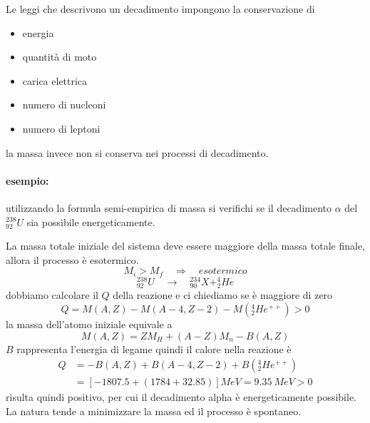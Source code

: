Le leggi che descrivono un decadimento impongono la conservazione di 
\begin{itemize}
\item energia
\item quantità di moto
\item carica elettrica
\item numero di nucleoni
\item numero di leptoni
\end{itemize}
la massa invece non si conserva nei processi di decadimento.

\paragraph{esempio:} utilizzando la formula semi-empirica di massa si verifichi se il decadimento $\alpha$ del $^{238}_{92} U$ sia possibile energeticamente.

La massa totale iniziale del sistema deve essere maggiore della massa totale finale, allora il processo è esotermico.
$$ M_i > M_f \quad\Rightarrow\quad esotermico $$
\begin{equation}
^{238}_{92} U \quad\longrightarrow\quad ^{234}_{90}X + ^{4}_{2}He
\end{equation}
dobbiamo calcolare il $Q$ della reazione e ci chiediamo se è maggiore di zero
\begin{equation}
Q = M(A,Z) - M(A-4,Z-2) - M(^{4}_{2}He^{++}) > 0
\end{equation}
la massa dell'atomo iniziale equivale a
\begin{equation}
M(A,Z) = Z M_H + (A-Z)M_n - B(A,Z)
\end{equation}
$B$ rappresenta l'energia di legame
quindi il calore nella reazione è
\begin{equation}
\begin{split}
Q  & = -B(A,Z) + B(A-4,Z-2) + B(^{4}_{2}He^{ ++ }) \\
& = [ -1807.5 + (1784 + 32.85)] MeV = \SI{9.35}{MeV} > 0
\end{split}
\end{equation}
risulta quindi positivo, per cui il decadimento alpha è energeticamente possibile.
La natura tende a minimizzare la massa ed il processo è spontaneo.






